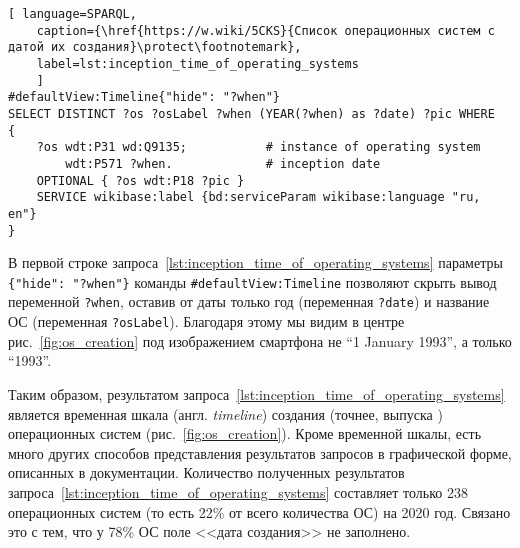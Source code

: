 \begin{lstlisting}[ language=SPARQL, 
	caption={\href{https://w.wiki/5CKS}{Список операционных систем с датой их создания}\protect\footnotemark},
	label=lst:inception_time_of_operating_systems
	]
#defaultView:Timeline{"hide": "?when"}
SELECT DISTINCT ?os ?osLabel ?when (YEAR(?when) as ?date) ?pic WHERE
{
    ?os wdt:P31 wd:Q9135;           # instance of operating system
        wdt:P571 ?when.             # inception date
    OPTIONAL { ?os wdt:P18 ?pic }
    SERVICE wikibase:label {bd:serviceParam wikibase:language "ru, en"}
}
\end{lstlisting}


%
В первой строке запроса~\ref{lst:inception_time_of_operating_systems} 
параметры \lstinline|{"hide": "?when"}| 
команды \lstinline|#defaultView:Timeline| позволяют скрыть вывод переменной \lstinline|?when|, 
оставив от даты только год (переменная \lstinline|?date|) 
и название ОС (переменная \lstinline|?osLabel|). 
Благодаря этому мы видим в центре рис.~\ref{fig:os_creation} 
под изображением смартфона не ``1 January 1993'', а только ``1993''. 

Таким образом, результатом запроса~\ref{lst:inception_time_of_operating_systems} 
является временная шкала (англ. \textit{timeline}) создания (точнее, выпуска%
) %
операционных систем (рис.~\ref{fig:os_creation}). 
Кроме временной шкалы, есть много других способов представления результатов запросов 
в графической форме, описанных в документации\autocite{WQSResultViews}. 
Количество полученных результатов запроса~\ref{lst:inception_time_of_operating_systems} 
составляет только 238 операционных систем (то есть 22\% от всего количества ОС) на 2020 год. 
Связано это с тем, что у 78\% ОС поле <<дата создания>> не заполнено.

